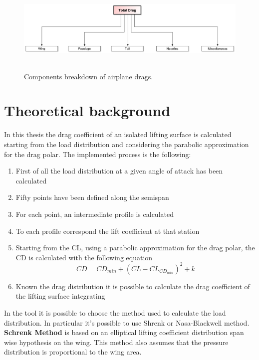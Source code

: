\begin{figure}[H]
\centering
{\includegraphics[height=3.6cm]{Immagini/dragco.pdf}} 
\caption{Components breakdown of airplane drags.}
\end{figure}

\section{Theoretical background}

In this thesis the drag coefficient of an isolated lifting surface is calculated starting from the load distribution and considering the parabolic approximation for the drag polar. The implemented process is the following:

\begin{enumerate}
\item First of all the load distribution at a given angle of attack has been calculated
\item Fifty points have been defined along the semispan
\item For each point, an intermediate profile is calculated
\item To each profile correspond the lift coefficient at that station
\item Starting from the CL, using a parabolic approximation for the drag polar, the CD is calculated with the following equation
\begin{equation}
CD = CD_{min} + (CL - CL_{CD_{min}})^2 + k
\end{equation}
\item Known the drag distribution it is possible to calculate the drag coefficient of the lifting surface integrating
\end{enumerate}

In the tool it is possible to choose the method used to calculate the load distribution. In particular it's possible to use Shrenk or Nasa-Blackwell method.\\

{\bfseries Schrenk Method} is based on an elliptical lifting coefficient distribution span wise hypothesis on the wing. This method also assumes that the pressure distribution is proportional to the wing area. \\ 

